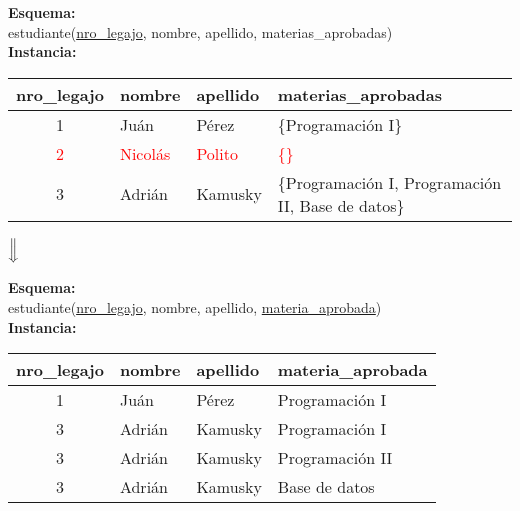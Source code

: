 \documentclass[preview]{standalone}
\begin{document}
\textbf{Esquema:}\\
estudiante(\underline{nro\_legajo}, nombre, apellido, materias\_aprobadas)\\

\textbf{Instancia:}
\begin{center}
\begin{tabular}{| c | l | l | l |}\hline			
	nro\_legajo & nombre & apellido & materias\_aprobadas \\\hline	
	1 & Ju\'an & P\'erez & \{\scriptsize{Programaci\'on I}\}\\
	\textcolor{red}{2} & \textcolor{red}{Nicol\'as} & \textcolor{red}{Polito} & \textcolor{red}{\{\}}\\
	3 & Adri\'an & Kamusky & \{\scriptsize{Programaci\'on I, Programaci\'on II, Base de datos}\}\\\hline
\end{tabular}
\end{center}


\begin{center}
$\Big\Downarrow$
\end{center}
\textbf{Esquema:}\\
estudiante(\underline{nro\_legajo}, nombre, apellido, \underline{materia\_aprobada})\\

\textbf{Instancia:}
\begin{center}
\begin{tabular}{| c | l | l | l |}\hline			
	nro\_legajo & nombre & apellido & materia\_aprobada \\\hline			
	1 & Ju\'an & P\'erez & Programaci\'on I\\
	3 & Adri\'an & Kamusky & Programaci\'on I\\
	3 & Adri\'an & Kamusky & Programaci\'on II\\
	3 & Adri\'an & Kamusky & Base de datos\\\hline
\end{tabular}
\end{center}
\end{document}
